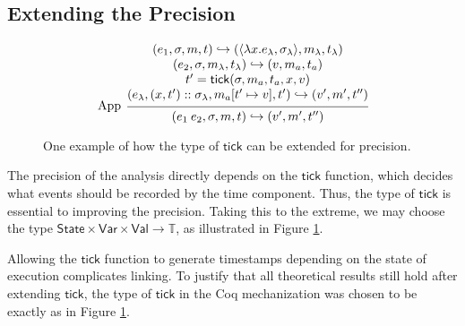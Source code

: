 \documentclass[acmsmall,screen,review]{acmart}\settopmatter{printfolios=true,printccs=false,printacmref=false}
\theoremstyle{acmdefinition}
\newcommand*{\cons}{::}
\newcommand*{\ExprVar}{\mathsf{Var}}
\newcommand*{\Time}{\mathbb{T}}
\newcommand*{\ctx}{\sigma}
\newcommand*{\Value}{\mathsf{Val}}
\newcommand*{\mem}{m}
\newcommand*{\State}{\mathsf{State}}
\newcommand*{\semarrow}{\hookrightarrow}
\newcommand*{\tick}{\mathsf{tick}}
\begin{document}
\subsection{Extending the Precision}
\begin{figure}[h!]
  \scriptsize
  \begin{flushright}
    \fbox{$(e,\ctx,\mem,t)\semarrow(V,\mem',t')\text{ or }(e',\ctx',\mem',t')$}
  \end{flushright}
  \[
    \begin{prooftree}
      \hypo{
        \begin{matrix}
          (e_{1}, \ctx, \mem, t)
          \semarrow
          (\langle\lambda x.e_{\lambda}, \ctx_{\lambda}\rangle, \mem_{\lambda}, t_{\lambda}) \\
          (e_{2}, \ctx, \mem_{\lambda}, t_{\lambda})
          \semarrow
          (v, \mem_{a}, t_{a})                                                               \\
          t'=\tick(\sigma,\mem_{a},t_{a},x,v)                                                \\
          (e_{\lambda}, (x, t')\cons \ctx_{\lambda}, \mem_{a}[t'\mapsto v], t')
          \semarrow
          (v', \mem',t'')
        \end{matrix}
      }
      \infer[left label={App}]1{
      (e_{1}\:e_{2}, \ctx, \mem, t)
      \semarrow
      (v', \mem',t'')
      }
    \end{prooftree}
  \]
  \caption{One example of how the type of $\tick$ can be extended for precision.}
  \label{fig:highprecision}
\end{figure}
The precision of the analysis directly depends on the $\tick$ function, which decides what events should be recorded by the time component.
Thus, the type of $\tick$ is essential to improving the precision.
Taking this to the extreme, we may choose the type $\State\times\ExprVar\times\Value\rightarrow\Time$, as illustrated in Figure \ref{fig:highprecision}.

Allowing the $\tick$ function to generate timestamps depending on the state of execution complicates linking.
To justify that all theoretical results still hold after extending $\tick$, the type of $\tick$ in the Coq mechanization was chosen to be exactly as in Figure \ref{fig:highprecision}.
\end{document}
